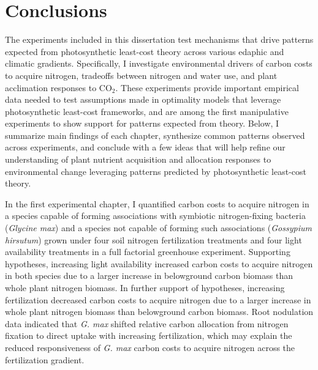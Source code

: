 \chapter{\textbf{Conclusions}}
\noindent The experiments included in this dissertation test mechanisms that drive patterns expected from photosynthetic least-cost theory across various edaphic and climatic gradients. Specifically, I investigate environmental drivers of carbon costs to acquire nitrogen, tradeoffs between nitrogen and water use, and plant acclimation responses to CO$_2$. These experiments provide important empirical data needed to test assumptions made in optimality models that leverage photosynthetic least-cost frameworks, and are among the first manipulative experiments to show support for patterns expected from theory. Below, I summarize main findings of each chapter, synthesize common patterns observed across experiments, and conclude with a few ideas that will help refine our understanding of plant nutrient acquisition and allocation responses to environmental change leveraging patterns predicted by photosynthetic least-cost theory.

In the first experimental chapter, I quantified carbon costs to acquire nitrogen in a species capable of forming associations with symbiotic nitrogen-fixing bacteria (\textit{Glycine max}) and a species not capable of forming such associations (\textit{Gossypium hirsutum}) grown under four soil nitrogen fertilization treatments and four light availability treatments in a full factorial greenhouse experiment. Supporting hypotheses, increasing light availability increased carbon costs to acquire nitrogen in both species due to a larger increase in belowground carbon biomass than whole plant nitrogen biomass. In further support of hypotheses, increasing fertilization decreased carbon costs to acquire nitrogen due to a larger increase in whole plant nitrogen biomass than belowground carbon biomass. Root nodulation data indicated that \textit{G. max} shifted relative carbon allocation from nitrogen fixation to direct uptake with increasing fertilization, which may explain the reduced responsiveness of \textit{G. max} carbon costs to acquire nitrogen across the fertilization gradient. 

